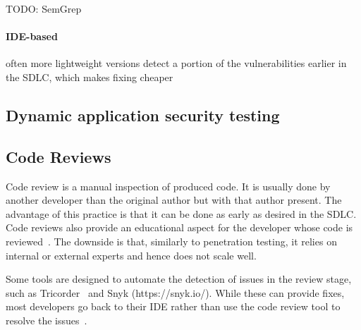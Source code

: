 TODO: SemGrep

\paragraph{IDE-based}
often more lightweight versions
detect a portion of the vulnerabilities earlier in the SDLC, which makes fixing cheaper


\subsection{Dynamic application security testing}

\subsection{Code Reviews}
Code review is a manual inspection of produced code. It is usually done by another developer than the original author but with that author present. 
The advantage of this practice is that it can be done as early as desired in the SDLC. Code reviews also provide an educational aspect for the developer whose code is reviewed~\cite{futcher2008guidelines}.
The downside is that, similarly to penetration testing, it relies on internal or external experts and hence does not scale well. %

Some tools are designed to automate the detection of issues in the review stage, such as Tricorder~\cite{sadowski2015tricorder} and Snyk (https://snyk.io/). While these can provide fixes, most developers go back to their IDE rather than use the code review tool to resolve the issues~\cite{sadowski2015tricorder}.